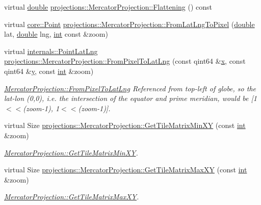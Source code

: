 \begin{DoxyCompactItemize}
\item 
virtual \hyperlink{_super_l_u_support_8h_a8956b2b9f49bf918deed98379d159ca7}{double} \hyperlink{group___o_p_map_widget_ga85c35978f6b64944591d25a095fc8e4d}{projections\-::\-Mercator\-Projection\-::\-Flattening} () const 
\item 
virtual \hyperlink{structcore_1_1_point}{core\-::\-Point} \hyperlink{group___o_p_map_widget_ga4e5e9d139c245de8a1278e83746ed240}{projections\-::\-Mercator\-Projection\-::\-From\-Lat\-Lng\-To\-Pixel} (\hyperlink{_super_l_u_support_8h_a8956b2b9f49bf918deed98379d159ca7}{double} lat, \hyperlink{_super_l_u_support_8h_a8956b2b9f49bf918deed98379d159ca7}{double} lng, \hyperlink{ioapi_8h_a787fa3cf048117ba7123753c1e74fcd6}{int} const \&zoom)
\item 
virtual \hyperlink{structinternals_1_1_point_lat_lng}{internals\-::\-Point\-Lat\-Lng} \hyperlink{group___o_p_map_widget_gaaa80928cf51f4c3a7e860678a7bf51ee}{projections\-::\-Mercator\-Projection\-::\-From\-Pixel\-To\-Lat\-Lng} (const qint64 \&\hyperlink{glext_8h_a1db9d104e3c2128177f26aff7b46982f}{x}, const qint64 \&\hyperlink{glext_8h_a42315f3ed8fff752bb47fd782309fcfc}{y}, const \hyperlink{ioapi_8h_a787fa3cf048117ba7123753c1e74fcd6}{int} \&zoom)
\begin{DoxyCompactList}\small\item\em \hyperlink{group___o_p_map_widget_gaaa80928cf51f4c3a7e860678a7bf51ee}{Mercator\-Projection\-::\-From\-Pixel\-To\-Lat\-Lng} Referenced from top-\/left of globe, so the lat-\/lon (0,0), i.\-e. the intersection of the equator and prime meridian, would be \mbox{[}1$<$$<$(zoom-\/1), 1$<$$<$(zoom-\/1)\mbox{]}. \end{DoxyCompactList}\item 
virtual Size \hyperlink{group___o_p_map_widget_ga9596b6c85652a05e732147c5e6e299ee}{projections\-::\-Mercator\-Projection\-::\-Get\-Tile\-Matrix\-Min\-X\-Y} (const \hyperlink{ioapi_8h_a787fa3cf048117ba7123753c1e74fcd6}{int} \&zoom)
\begin{DoxyCompactList}\small\item\em \hyperlink{group___o_p_map_widget_ga9596b6c85652a05e732147c5e6e299ee}{Mercator\-Projection\-::\-Get\-Tile\-Matrix\-Min\-X\-Y}. \end{DoxyCompactList}\item 
virtual Size \hyperlink{group___o_p_map_widget_ga4c7d16ae190aea2fd84e2e046b14c39e}{projections\-::\-Mercator\-Projection\-::\-Get\-Tile\-Matrix\-Max\-X\-Y} (const \hyperlink{ioapi_8h_a787fa3cf048117ba7123753c1e74fcd6}{int} \&zoom)
\begin{DoxyCompactList}\small\item\em \hyperlink{group___o_p_map_widget_ga4c7d16ae190aea2fd84e2e046b14c39e}{Mercator\-Projection\-::\-Get\-Tile\-Matrix\-Max\-X\-Y}. \end{DoxyCompactList}\item 

\end{DoxyCompactItemize}
